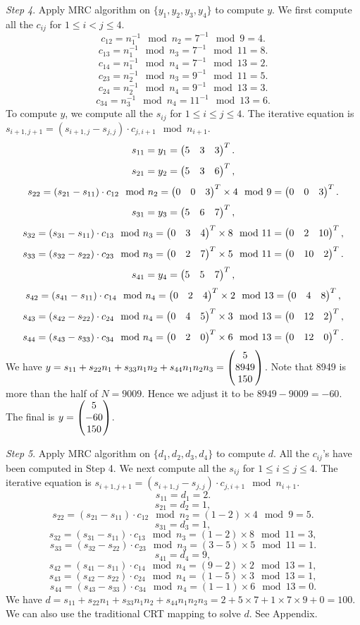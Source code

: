 \documentclass[12pt]{article}
\theoremstyle{plain}
\begin{document}
\emph{Step 4}. Apply MRC algorithm on $\{y_1,y_2,y_3,y_4\}$ to compute $y$.
We first compute all the $c_{ij}$ for $1\leq i < j \leq 4$.
$$c_{12} = n_1^{-1} \mod n_2 = 7^{-1} \mod 9 = 4.$$
$$c_{13} = n_1^{-1} \mod n_3 = 7^{-1} \mod 11 = 8.$$
$$c_{14} = n_1^{-1} \mod n_4 = 7^{-1} \mod 13 = 2.$$
$$c_{23} = n_2^{-1} \mod n_3 = 9^{-1} \mod 11 = 5.$$
$$c_{24} = n_2^{-1} \mod n_4 = 9^{-1} \mod 13 = 3.$$
$$c_{34} = n_3^{-1} \mod n_4 = 11^{-1} \mod 13 = 6.$$
To compute $y$, we compute all the $s_{ij}$ for $1\leq i\leq j \leq 4$. The iterative equation is $s_{i+1,j+1} = (s_{i+1,j} - s_{j,j})\cdot c_{j,i+1} \mod n_{i+1}$. 
$$s_{11} = y_1 = \begin{pmatrix}5 & 3 & 3\end{pmatrix}^T.$$
$$s_{21} = y_2 = \begin{pmatrix}5 & 3 & 6\end{pmatrix}^T,$$
$$s_{22} = (s_{21}-s_{11})\cdot c_{12} \mod n_2 = \begin{pmatrix}0 & 0 & 3\end{pmatrix}^T\times 4 \mod 9 = \begin{pmatrix}0 & 0 & 3\end{pmatrix}^T.$$
$$s_{31} = y_3 = \begin{pmatrix}5 & 6 & 7\end{pmatrix}^T,$$
$$s_{32} = (s_{31}-s_{11})\cdot c_{13} \mod n_3 = \begin{pmatrix}0 & 3 & 4\end{pmatrix}^T\times 8 \mod 11 = \begin{pmatrix}0 & 2 & 10\end{pmatrix}^T,$$
$$s_{33} = (s_{32}-s_{22})\cdot c_{23} \mod n_3 = \begin{pmatrix}0 & 2 & 7\end{pmatrix}^T\times 5 \mod 11 = \begin{pmatrix}0 & 10 & 2\end{pmatrix}^T.$$
$$s_{41} = y_4 = \begin{pmatrix}5 & 5 & 7\end{pmatrix}^T,$$
$$s_{42} = (s_{41}-s_{11})\cdot c_{14} \mod n_4 = \begin{pmatrix}0 & 2 & 4\end{pmatrix}^T\times 2 \mod 13 = \begin{pmatrix}0 & 4 & 8\end{pmatrix}^T,$$
$$s_{43} = (s_{42}-s_{22})\cdot c_{24} \mod n_4 = \begin{pmatrix}0 & 4 & 5\end{pmatrix}^T\times 3 \mod 13 = \begin{pmatrix}0 & 12 & 2\end{pmatrix}^T,$$
$$s_{44} = (s_{43}-s_{33})\cdot c_{34} \mod n_4 = \begin{pmatrix}0 & 2 & 0\end{pmatrix}^T\times 6\mod 13 = \begin{pmatrix}0 & 12 & 0\end{pmatrix}^T.$$
We have $y = s_{11} + s_{22}n_1 + s_{33}n_1n_2 + s_{44}n_1n_2n_3 = \begin{pmatrix}5 \\ 8949 \\ 150\end{pmatrix}$.
Note that 8949 is more than the half of $N=9009$. Hence we adjust it to be $8949-9009=-60$. The final is $y=\begin{pmatrix}5 \\ -60 \\ 150\end{pmatrix}$.

\emph{Step 5}. Apply MRC algorithm on $\{d_1,d_2,d_3,d_4\}$ to compute $d$. 
All the $c_{ij}$'s have been computed in Step 4. 
We next compute all the $s_{ij}$ for $1\leq i\leq j \leq 4$. The iterative equation is $s_{i+1,j+1} = (s_{i+1,j} - s_{j,j})\cdot c_{j,i+1} \mod n_{i+1}$. 
$$s_{11} = d_1 = 2.$$
$$s_{21} = d_2 = 1,$$
$$s_{22} = (s_{21}-s_{11})\cdot c_{12} \mod n_2 = (1-2)\times 4 \mod 9 = 5.$$
$$s_{31} = d_3 = 1,$$
$$s_{32} = (s_{31}-s_{11})\cdot c_{13} \mod n_3 = (1-2)\times 8 \mod 11 = 3,$$
$$s_{33} = (s_{32}-s_{22})\cdot c_{23} \mod n_3 = (3-5)\times 5 \mod 11 = 1.$$
$$s_{41} = d_4 = 9,$$
$$s_{42} = (s_{41}-s_{11})\cdot c_{14} \mod n_4 = (9-2)\times 2 \mod 13 = 1,$$
$$s_{43} = (s_{42}-s_{22})\cdot c_{24} \mod n_4 = (1-5)\times 3 \mod 13 = 1,$$
$$s_{44} = (s_{43}-s_{33})\cdot c_{34} \mod n_4 = (1-1)\times 6\mod 13 = 0.$$
We have $d = s_{11} + s_{22}n_1 + s_{33}n_1n_2 + s_{44}n_1n_2n_3 = 2+5\times 7+1\times 7\times 9 + 0 = 100$.
We can also use the traditional CRT mapping to solve $d$. See Appendix.
\end{document}
